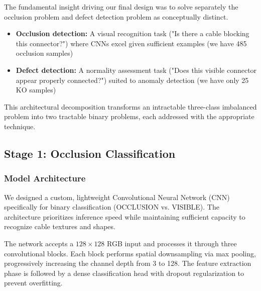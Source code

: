 \documentclass[11pt,a4paper,draft]{article}
\begin{document}
The fundamental insight driving our final design was to solve separately the occlusion problem and defect detection problem as conceptually distinct.

\begin{itemize}
    \item \textbf{Occlusion detection:} A visual recognition task ("Is there a cable blocking this connector?") where CNNs excel given sufficient examples (we have 485 occlusion samples)
    \item \textbf{Defect detection:} A normality assessment task ("Does this visible connector appear properly connected?") suited to anomaly detection (we have only 25 KO samples)
\end{itemize}

This architectural decomposition transforms an intractable three-class imbalanced problem into two tractable binary problems, each addressed with the appropriate technique.

\subsection{Stage 1: Occlusion Classification}

\subsubsection{Model Architecture}

We designed a custom, lightweight Convolutional Neural Network (CNN) specifically for binary classification (OCCLUSION vs. VISIBLE). The architecture prioritizes inference speed while maintaining sufficient capacity to recognize cable textures and shapes.

The network accepts a $128 \times 128$ RGB input and processes it through three convolutional blocks. Each block performs spatial downsampling via max pooling, progressively increasing the channel depth from 3 to 128. The feature extraction phase is followed by a dense classification head with dropout regularization to prevent overfitting.
\end{document}
